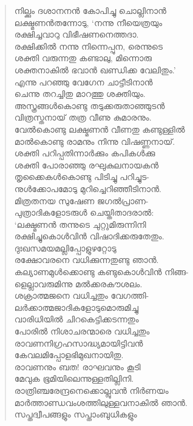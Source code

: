 \begin{verse}
നില്ക്കും ദശാനനന്‍ കോപിച്ചു ചൊല്ലിനാന്‍\\
ലക്ഷ്മണന്‍തന്നോടു, ‘നന്നു നീയെത്രയും\\
രക്ഷിച്ചവാറു വിഭീഷണനെത്തദാ.\\
രക്ഷിക്കില്‍ നന്നു നിന്നെപ്പുന, രെന്നുടെ\\
ശക്തി വരുന്നതു കണ്ടാലു, മിന്നൊരു\\
ശക്തനാകില്‍ ഭവാന്‍ ഖണ്ഡിക്ക വേലിതും.’\\
എന്നു പറഞ്ഞു വേഗേന ചാട്ടീടിനാന്‍\\
ചെന്നു തറച്ചിതു മാറത്തു ശക്തിയും.\\
അസ്ത്രങ്ങള്‍കൊണ്ടു തടുക്കരുതാഞ്ഞുടന്‍\\
വിത്രസ്തനായ് തത്ര വീണു കുമാരനും.\\
വേല്‍കൊണ്ടു ലക്ഷ്മണന്‍ വീണതു കണ്ടുള്ളില്‍\\
മാല്‍കൊണ്ടു രാമനും നിന്നു വിഷണ്ണനായ്.\\
ശക്തി പറിപ്പതിന്നാര്‍ക്കും കപികള്‍ക്കു\\
ശക്തി പോരാഞ്ഞു രഘുകുലനായകന്‍\\
തൃക്കൈകള്‍കൊണ്ടു പിടിച്ചു പറിച്ചുട-\\
നുള്‍ക്കോപമോടു മുറിച്ചെറിഞ്ഞീടിനാന്‍.\\
മിത്രതനയ സുഷേണ ജഗല്‍പ്രാണ-\\
പുത്രാദികളോടരുള്‍ ചെയ്തിതാദരാല്‍:\\
‘ലക്ഷ്മണന്‍ തന്നുടെ ചുറ്റുമിരുന്നിനി\\
രക്ഷിച്ചുകൊള്‍വിന്‍ വിഷാദിക്കരുതേതും.\\
ദുഃഖസമയമല്ലിപ്പോളുഴറ്റോടു\\
രക്ഷോവരനെ വധിക്കുന്നതുണ്ടു ഞാന്‍.\\
കല്യാണമുള്‍ക്കൊണ്ടു കണ്ടുകൊള്‍വിന്‍ നിങ്ങ-\\
ളെല്ലാവരുമിന്നു മല്‍ക്കരകൗശലം.\\
ശക്രാത്മജനെ വധിച്ചതും വേഗത്തി-\\
ലര്‍ക്കാത്മജാദികളോടുമൊരുമിച്ചു\\
വാരിധിയില്‍ ചിറകെട്ടിക്കടന്നതും\\
പോരില്‍ നിശാചരന്മാരെ വധിച്ചതും\\
രാവണനിഗ്രഹസാദ്ധ്യമായിട്ടിവന്‍\\
കേവലമിപ്പോളഭിമുഖനായിതു.\\
രാവണനും ബത! രാഘവനും കൂടി\\
മേവുക ഭൂമിയിലെന്നുള്ളതില്ലിനി.\\
രാത്രിഞ്ചരേന്ദ്രനെക്കൊല്ലുവന്‍ നിര്‍ണയം\\
മാര്‍ത്താണ്ഡവംശത്തിലുള്ളവനാകില്‍ ഞാന്‍.\\
സപ്തദ്വീപങ്ങളും സപ്താംബുധികളും\\

\end{verse}
